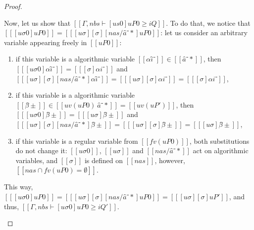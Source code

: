 \begin{proof}
\begin{caseof}
            Now, let us show that $[[Γ, nbs ⊢ [us0]uP0 ≥ iQ]]$.
            To do that, we notice that $[[ [uσ0]uP0 ]] = [[ [uσ][σ][nas/â⁻*]uP0 ]]$:
            let us consider an arbitrary variable appearing freely in $[[uP0]]$:
            \begin{enumerate}
                \item if this variable is a algorithmic variable $[[αî⁻]] \in [[â⁻*]]$, then
                $[[ [uσ0]αî⁻ ]] = [[ [σ]αi⁻ ]]$ and 
                $[[ [uσ][σ][nas/â⁻*]αî⁻ ]] = [[ [uσ][σ]αi⁻ ]] = [[ [σ]αi⁻ ]]$,
                \item if this variable is a algorithmic variable $[[β̂±]] \in [[ uv(uP0) \ {â⁻*} ]] = [[uv(uP')]]$, then
                $[[ [uσ0]β̂± ]] = [[ [uσ]β̂± ]]$ and $[[ [uσ][σ][nas/â⁻*]β̂± ]] = [[ [uσ][σ]β̂± ]] = [[ [uσ]β̂± ]]$,
                \item if this variable is a regular variable from $[[fv(uP0)]]$, both substitutions do not change it:
                $[[ uσ0 ]]$, $[[ uσ ]]$ and $[[ nas / â⁻* ]]$ act on algorithmic variables, 
                and $[[σ]]$ is defined on $[[nas]]$, however, $[[{nas} ∩ fv(uP0) = ∅]]$.
            \end{enumerate}
            This way, $[[ [uσ0]uP0 ]] = [[ [uσ][σ][nas/â⁻*]uP0 ]] = [[ [uσ][σ]uP' ]]$,
            and thus, $[[ Γ, nbs ⊢ [uσ0]uP0 ≥ iQ' ]]$.
    \end{caseof}
\end{proof}

